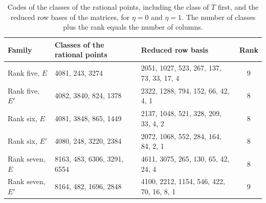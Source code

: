 \begin{table}[!htbp]
\centering\small
\begin{tabular}{@{}lllc@{}}
\toprule
Family & Classes of the rational points & Reduced row basis & Rank\\
\midrule
Rank five, $E$ & 4081, 243, 3274 & 2051, 1027, 523, 267, 137, 73, 33, 17, 4 & 9\\
Rank five, $E'$ & 4082, 3840, 824, 1378 & 2322, 1288, 794, 152, 66, 42, 4, 1 & 8\\
Rank six, $E$ & 4081, 3848, 865, 1449 & 2137, 1048, 521, 328, 209, 33, 4, 2 & 8\\
Rank six, $E'$ & 4080, 248, 3220, 2384 & 2072, 1068, 552, 284, 164, 84, 2, 1 & 8\\
Rank seven, $E$ & 8163, 483, 6306, 3291, 6554 & 4611, 3075, 265, 130, 65, 42, 24, 4 & 8\\
Rank seven, $E'$ & 8164, 482, 1696, 2848 & 4100, 2212, 1154, 546, 422, 70, 16, 8, 1 & 9\\
\bottomrule
\end{tabular}
\caption{Codes of the classes of the rational points, including the class of $T$ first, and the reduced row bases of the matrices, for $\eta=0$ and $\eta=1$. The number of classes plus the rank equals the number of columns.}
\label{tab:codes-classes}
\end{table}
